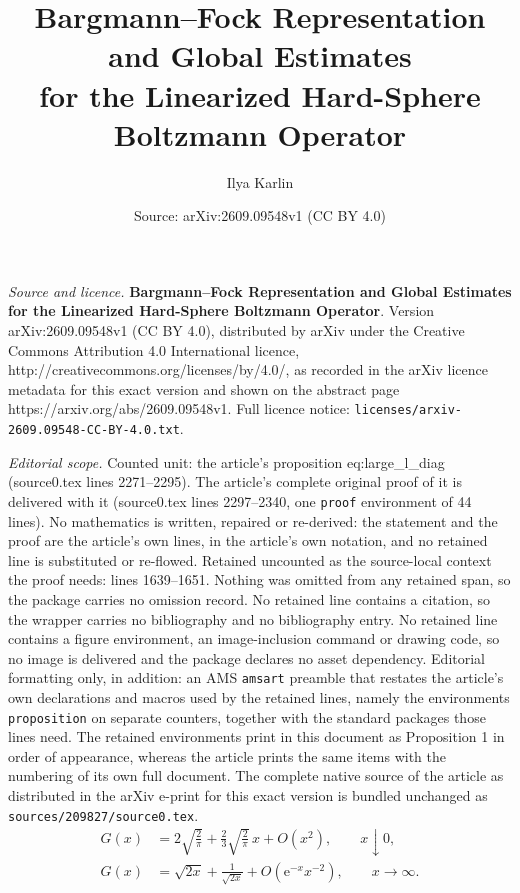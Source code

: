 \documentclass[10pt,a4paper]{amsart}
\title{\textbf{Bargmann--Fock Representation and Global Estimates\\ for the Linearized Hard-Sphere Boltzmann Operator}}
\author{Ilya Karlin}
\date{Source: arXiv:2609.09548v1 (CC BY 4.0)}
\newcommand{\e}{\mathrm e}
\begin{document}
\maketitle

\noindent\emph{Source and licence.} \textbf{Bargmann--Fock Representation and Global Estimates\\ for the Linearized Hard-Sphere Boltzmann Operator}. Version arXiv:2609.09548v1 (CC BY 4.0), distributed by arXiv under the Creative Commons Attribution 4.0 International licence, http://creativecommons.org/licenses/by/4.0/, as recorded in the arXiv licence metadata for this exact version and shown on the abstract page https://arxiv.org/abs/2609.09548v1. Full licence notice: \texttt{licenses/arxiv-2609.09548-CC-BY-4.0.txt}.\par\smallskip

\noindent\textit{Editorial scope.} Counted unit: the article's proposition eq:large\_l\_diag (source0.tex lines 2271--2295). The article's complete original proof of it is delivered with it (source0.tex lines 2297--2340, one \texttt{proof} environment of 44 lines). No mathematics is written, repaired or re-derived: the statement and the proof are the article's own lines, in the article's own notation, and no retained line is substituted or re-flowed.  Retained uncounted as the source-local context the proof needs: lines 1639--1651.  Nothing was omitted from any retained span, so the package carries no omission record.  No retained line contains a citation, so the wrapper carries no bibliography and no bibliography entry.  No retained line contains a figure environment, an image-inclusion command or drawing code, so no image is delivered and the package declares no asset dependency.  Editorial formatting only, in addition: an AMS \texttt{amsart} preamble that restates the article's own declarations and macros used by the retained lines, namely the environments \texttt{proposition} on separate counters, together with the standard packages those lines need.  The retained environments print in this document as Proposition 1 in order of appearance, whereas the article prints the same items with the numbering of its own full document.  The complete native source of the article as distributed in the arXiv e-print for this exact version is bundled unchanged as \texttt{sources/209827/source0.tex}.
\begin{align}
 G(x)
 &=2\sqrt{\frac2\pi}
 +\frac23\sqrt{\frac2\pi}\,x+O(x^2),
 \qquad x\downarrow0,
 \label{eq:Gsmall}
 \\
 G(x)
 &=\sqrt{2x}+\frac1{\sqrt{2x}}
 +O(\e^{-x}x^{-2}),
 \qquad x\to\infty.
 \label{eq:Glarge}
\end{align}
\end{document}
